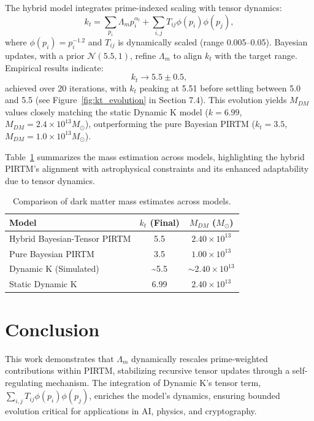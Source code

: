 \documentclass{article}
\theoremstyle{plain}
\begin{document}
The hybrid model integrates prime-indexed scaling with tensor dynamics:
\begin{equation}
    k_t = \sum_{p_i} \Lambda_m p_i^{\alpha_t} + \sum_{i,j} T_{ij} \phi(p_i) \phi(p_j),
\end{equation}
where \( \phi(p_i) = p_i^{-1.2} \) and \( T_{ij} \) is dynamically scaled (range 0.005–0.05). Bayesian updates, with a prior \( \mathcal{N}(5.5, 1) \), refine \( \Lambda_m \) to align \( k_t \) with the target range. Empirical results indicate:
\begin{equation}
    k_t \rightarrow 5.5 \pm 0.5,
\end{equation}
achieved over 20 iterations, with \( k_t \) peaking at 5.51 before settling between 5.0 and 5.5 (see Figure~\ref{fig:kt_evolution} in Section 7.4). This evolution yields \( M_{DM} \) values closely matching the static Dynamic K model (\( k = 6.99 \), \( M_{DM} = 2.4 \times 10^{13} M_\odot \)), outperforming the pure Bayesian PIRTM (\( k_t = 3.5 \), \( M_{DM} = 1.0 \times 10^{13} M_\odot \)).

Table~\ref{tab:mdm_comparison} summarizes the mass estimation across models, highlighting the hybrid PIRTM’s alignment with astrophysical constraints and its enhanced adaptability due to tensor dynamics.

\begin{table}[h]
    \centering
    \begin{tabular}{|l|c|c|}
        \hline
        Model & \( k_t \) (Final) & \( M_{DM} \) (\( M_\odot \)) \\
        \hline
        Hybrid Bayesian-Tensor PIRTM & 5.5 & \( 2.40 \times 10^{13} \) \\
        Pure Bayesian PIRTM & 3.5 & \( 1.00 \times 10^{13} \) \\
        Dynamic K (Simulated) & \sim5.5 & \( \sim2.40 \times 10^{13} \) \\
        Static Dynamic K & 6.99 & \( 2.40 \times 10^{13} \) \\
        \hline
    \end{tabular}
    \caption{Comparison of dark matter mass estimates across models.}
    \label{tab:mdm_comparison}
\end{table}

\section{Conclusion}
This work demonstrates that \( \Lambda_m \) dynamically rescales prime-weighted contributions within PIRTM, stabilizing recursive tensor updates through a self-regulating mechanism. The integration of Dynamic K’s tensor term, \( \sum_{i,j} T_{ij} \phi(p_i) \phi(p_j) \), enriches the model’s dynamics, ensuring bounded evolution critical for applications in AI, physics, and cryptography. 
\end{document}
